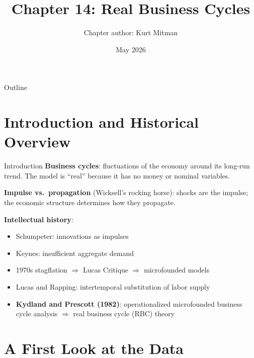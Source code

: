 \documentclass[blue]{beamer}
\title[Chapter14]{Chapter 14: Real Business Cycles}
\author[Kurt Mitman]{Chapter author: Kurt Mitman}
\date[May 2026]{May 2026}
\begin{document}
  \frame
  {
    \titlepage
  }


\begin{frame}{Outline}
	\tableofcontents
\end{frame}

%
\section{Introduction and Historical Overview}

\begin{frame}{Introduction}
	\textbf{Business cycles}: fluctuations of the economy around its long-run trend. The model is ``real'' because it has no money or nominal variables.
	
	\textbf{Impulse vs.\ propagation} (Wicksell's rocking horse): shocks are the impulse; the economic structure determines how they propagate.
	
	\textbf{Intellectual history}:
	\vspace{-10pt}
	\begin{itemize}
		\item Schumpeter: innovations as impulses 
		\item Keynes: insufficient aggregate demand 
		\item 1970s stagflation $\Rightarrow$ Lucas Critique $\Rightarrow$ microfounded models
		\item Lucas and Rapping: intertemporal substitution of labor supply
		\item \textbf{Kydland and Prescott (1982)}: operationalized microfounded business cycle analysis $\Rightarrow$ real business cycle (RBC) theory
	\end{itemize}
\end{frame}

\section{A First Look at the Data}
\end{document}
